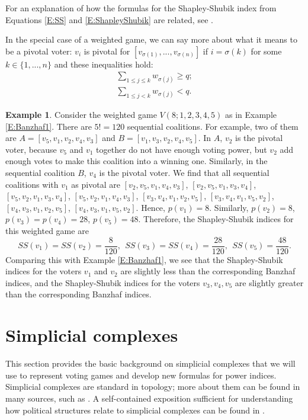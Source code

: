 \documentclass[11pt]{amsart}
\theoremstyle{plain}
\theoremstyle{definition}
\newtheorem{example}[thm]{Example}
\theoremstyle{remark}
\begin{document}
For an explanation of how the formulas for the Shapley-Shubik index from Equations \ref{E:SS} and \ref{E:ShapleyShubik} are related, see \cite{Napel:VotingPower}.


In the special case of  a weighted game, we can say more about what it means to be a pivotal voter: $v_i$ is pivotal for $[v_{\sigma(1)}, ..., v_{\sigma(n)}]$ if $i=\sigma(k)$ for some $k\in \{1,...,n\}$ and these inequalities hold:
\begin{align*}
\sum_{1\leq j\leq k}w_{\sigma(j)}\geq q; \\
\sum_{1\leq j< k}w_{\sigma(j)}<q.
% 
% 
\end{align*}



\begin{example}
Consider the weighted game $V(8; 1, 2, 3, 4, 5)$ as in Example \ref{E:Banzhaf1}. There are $5!=120$ sequential coalitions. For example, two of them are $A=[v_5, v_1, v_2, v_4, v_3]$ and $B=[v_1, v_3, v_2, v_4, v_5]$. In $A$, $v_2$ is the pivotal voter, because $v_5$ and $v_1$ together do not have enough voting power, but $v_2$ add enough votes to make this coalition into a winning one. Similarly, in the sequential coalition $B$, $v_4$ is the pivotal voter. We find that all sequential coalitions with $v_1$ as pivotal are $[v_2, v_5, v_1, v_4, v_3]$, $[v_2, v_5, v_1, v_3, v_4]$, $[v_5, v_2, v_1, v_3, v_4]$, $[v_5, v_2, v_1, v_4, v_3]$, $[v_3, v_4, v_1, v_2, v_5]$, $[v_3, v_4, v_1, v_5, v_2]$, $[v_4, v_3, v_1, v_2, v_5]$, $[v_4, v_3, v_1, v_5, v_2]$. Hence, $p(v_1)=8$. Similarly, $p(v_2)=8$, $p(v_3)=p(v_4)=28$, $p(v_5)=48$. Therefore, the Shapley-Shubik indices for this weighted game are
$$SS(v_1)=SS(v_2)=\frac{8}{120},\ \  SS(v_3)=SS(v_4)=\frac{28}{120},\ \  SS(v_5)=\frac{48}{120}.$$
Comparing this with Example \ref{E:Banzhaf1}, we see that the Shapley-Shubik indices for the voters $v_1$ and $v_2$ are slightly less than the corresponding Banzhaf indices, and the Shapley-Shubik indices for the voters $v_3, v_4, v_5$ are slightly greater than the corresponding Banzhaf indices.
\end{example}



\section{Simplicial complexes}\label{S:SC}
This section provides the basic background on simplicial complexes that we will use to represent voting games and develop new formulas for power indices. Simplicial complexes are standard in topology; more about them can be found in many sources, such as \cite{FPR09, Mat03, Spa95}. A self-contained exposition sufficient for understanding how political structures relate to simplicial complexes can be found in \cite{MV:Politics}.
\end{document}
